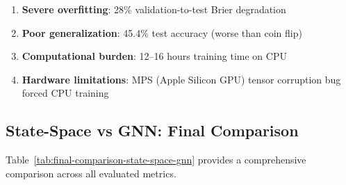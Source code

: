 \begin{enumerate}
    \item \textbf{Severe overfitting}: 28\% validation-to-test Brier degradation
    \item \textbf{Poor generalization}: 45.4\% test accuracy (worse than coin flip)
    \item \textbf{Computational burden}: 12--16 hours training time on CPU
    \item \textbf{Hardware limitations}: MPS (Apple Silicon GPU) tensor corruption bug forced CPU training
\end{enumerate}

\subsection{State-Space vs GNN: Final Comparison}

Table~\ref{tab:final-comparison-state-space-gnn} provides a comprehensive comparison across all evaluated metrics.

